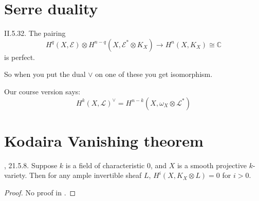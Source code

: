 \section{Serre duality}
\label{section-serre-duality}

\begin{theorem}
\label{theorem-serre-duality}
\cite{voi} II.5.32. The pairing
$$
H^q(X,\mathcal{E})\otimes
H^{n-q}(X,\mathcal{E}^*\otimes K_X)\to H^{n}(X,K_X)\cong\mathbb{C}
$$
is perfect.
\end{theorem}

So when you put the dual \(\vee\) on one of these you get isomorphism.

Our course version says:
$$
H^{k}(X,\mathcal{L})^{\vee}=H^{n-k}(X,\omega_X \otimes \mathcal{L}^*)
$$
\section{Kodaira Vanishing theorem}
\label{section-Kodaira-vanishing-theorem}

\begin{theorem}[Kodaira]
\label{theorem-Kodaira-vanishing}
\cite{sea}, 21.5.8. Suppose $k$ is a field of characteristic 0, and $X$ is a
smooth projective $k$-variety. Then for any ample invertible sheaf $L$,
$H^{i}(X,K_X \otimes L)=0$ for $i>0$.
\end{theorem}

\begin{proof}
No proof in \cite{sea}.
\end{proof}






